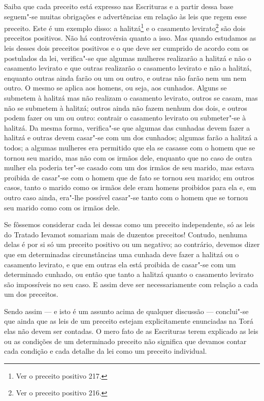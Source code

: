 \smallskip

Saiba que cada preceito está expresso nas Escrituras e a partir dessa
base seguem"-se muitas obrigações e advertências em relação às leis que
regem esse preceito. Este é um exemplo disso: a
halitzá\starr\footnote{Ver o preceito positivo 217.} e o casamento
levirato\starr\footnote{Ver o preceito positivo 216.} são dois preceitos positivos. Não há
controvérsia quanto a isso. Mas quando estudamos as leis desses dois
preceitos positivos e o que deve ser cumprido de acordo com os
postulados da lei, verifica"-se que algumas mulheres realizarão a
halitzá\starr{} e não o casamento levirato\starr{} e que outras realizarão o
casamento levirato\starr{} e não a halitzá\starr, enquanto outras ainda farão ou
um ou outro, e outras não farão nem um nem outro. O mesmo se aplica aos
homens, ou seja, aos cunhados. Alguns se submetem à halitzá\starr{} mas não
realizam o casamento levirato\starr, outros se casam, mas não se submetem à
halitzá\starr; outros ainda não fazem nenhum dos dois, e outros podem
fazer ou um ou outro: contrair o casamento levirato\starr{} ou submeter"-se à
halitzá\starr. Da mesma forma, verifica"-se que algumas das cunhadas devem
fazer a halitzá\starr{} e outras devem casar"-se com um dos cunhados; algumas
farão a halitzá\starr{} a todos; a algumas mulheres era permitido que ela se
casasse com o homem que se tornou seu marido, mas não com os irmãos
dele, enquanto que no caso de outra mulher ela poderia ter"-se casado com
um dos irmãos de seu marido, mas estava proibida de casar"-se com o homem
que de fato se tornou seu marido; em outros casos, tanto o marido como
os irmãos dele eram homens proibidos para ela e, em outro caso ainda,
era"-lhe possível casar"-se tanto com o homem que se tornou seu marido
como com os irmãos dele.

Se fôssemos considerar cada lei dessas como um preceito independente,
só as leis do Tratado Ievamot\starr{} somariam mais de duzentos preceitos!
Contudo, nenhuma delas é por si só um preceito positivo ou um negativo;
ao contrário, devemos dizer que em determinadas circunstâncias uma
cunhada deve fazer a halitzá\starr{} ou o casamento levirato\starr, e que em
outras ela está proibida de casar"-se com um determinado cunhado, ou
então que tanto a halitzá\starr{} quanto o casamento levirato\starr{} são
impossíveis no seu caso. E assim deve ser necessariamente com relação a
cada um dos preceitos.

Sendo assim --- e isto é um assunto acima de qualquer discussão
--- conclui"-se que ainda que as leis de um preceito estejam
explicitamente enunciadas na Torá\starr{} elas não devem ser contadas. O mero
fato de as Escrituras terem explicado as leis ou as condições de um
determinado preceito não significa que devamos contar cada condição e
cada detalhe da lei como um preceito individual.

